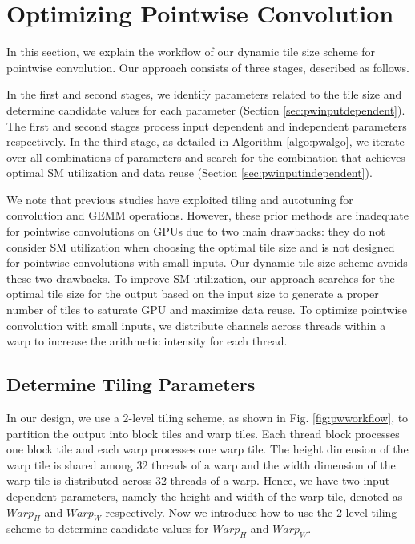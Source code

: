 \section{Optimizing Pointwise Convolution}
\label{sec:pwconv} In this section, we explain the workflow of our dynamic tile size scheme for pointwise convolution. Our approach
consists of three stages, described as follows.

In the first and second stages, we identify parameters related to the tile size and determine candidate values for each parameter (Section
\ref{sec:pwinputdependent}). The first and second stages process input dependent and independent parameters respectively. In the third
stage, as detailed in Algorithm \ref{algo:pwalgo}, we iterate over all combinations of parameters and search for the combination that
achieves optimal SM utilization and data reuse (Section \ref{sec:pwinputindependent}).

We note that previous studies \cite{tanner2018tensile, kelefouras2016high, abdelfattah2019fast, kurzak2015implementation,
jiang2020enabling, tillet2017input, lan2019feathercnn,zhang2012autogeneration} have exploited tiling and autotuning for convolution and
GEMM operations. However, these prior methods are inadequate for pointwise convolutions on GPUs due to two main drawbacks: they do not
consider SM utilization when choosing the optimal tile size and is not designed for pointwise convolutions with small inputs. Our dynamic
tile size scheme avoids these two drawbacks. To improve SM utilization, our approach searches for the optimal tile size for the output
based on the input size to generate a proper number of tiles to saturate GPU and maximize data reuse. To optimize pointwise convolution
with small inputs, we distribute channels across threads within a warp to increase the arithmetic intensity for each thread.


\subsection{Determine Tiling Parameters\label{sec:pwinputdependent}}

In our design, we use a 2-level tiling scheme, as shown in Fig. \ref{fig:pwworkflow}, to partition the output into block tiles and warp tiles.
Each thread block processes one block tile and each warp processes one warp tile.
The height dimension of the warp tile is shared among 32 threads of a warp and the width dimension of the warp tile is distributed across 32 threads of a warp.
Hence, we have two input dependent parameters, namely the height and width of the warp tile, denoted as $Warp_H$ and $Warp_W$ respectively.
Now we introduce how to use the 2-level tiling scheme to determine candidate values for $Warp_H$ and $Warp_W$.
